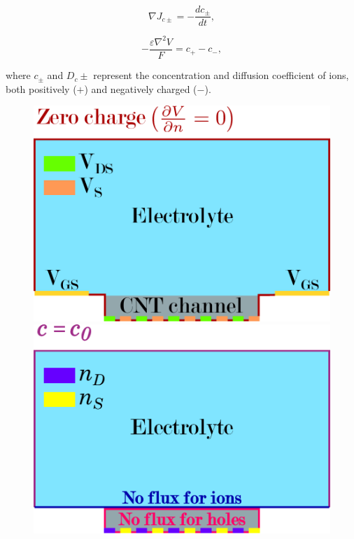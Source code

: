 \begin{equation}
    \label{eq:continuity_ion}
    \nabla J_{c\pm} = -\dfrac{dc_{\pm}}{dt},
\end{equation}

\begin{equation}
    \label{eq:poisson_ion}
    -\dfrac{\varepsilon\nabla^2V}{F} = c_+ - c_-,
\end{equation}

where $c_{\pm}$ and $D_c\pm$ represent the concentration and diffusion coefficient of ions, both positively ($+$) and negatively charged ($-$).

\begin{figure}[h]
    \centering
    \begin{minipage}{0.3\textwidth}
        \centering
        \includegraphics[width=\textwidth]{figures/chapter1/simulations/Fig7_boundaries1.pdf}
    \end{minipage}
    \hspace{10pt}
    \begin{minipage}{0.3\textwidth}
        \includegraphics[width=\textwidth]{figures/chapter1/simulations/Fig7_boundaries2.pdf}

\end{minipage}
\end{figure}
